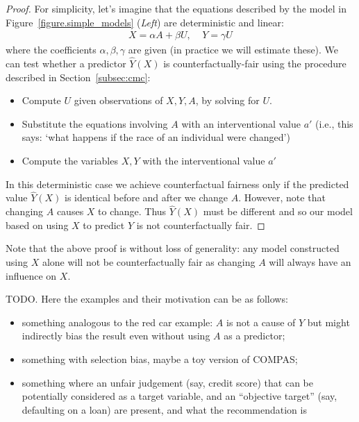 \begin{proof}
For simplicity, let's imagine that the equations described by the model in Figure~\ref{figure.simple_models} (\emph{Left}) are deterministic and linear:
\begin{align}
X = \alpha A + \beta U, \;\;\;\; Y = \gamma U \nonumber
\end{align}
where the coefficients $\alpha,\beta,\gamma$ are given (in practice we will estimate these). We can test whether a predictor $\hat{Y}(X)$ is counterfactually-fair using the procedure described in Section~\ref{subsec:cmc}:
\begin{itemize}
\item Compute $U$ given observations of $X,Y,A$, by solving for $U$.
\item Substitute the equations involving $A$ with an interventional value $a'$ (i.e., this says: `what happens if the race of an individual were changed')
\item Compute the variables $X,Y$ with the interventional value $a'$
\end{itemize}
In this deterministic case we achieve counterfactual fairness only if the predicted value $\hat{Y}(X)$ is identical before and after we change $A$. However, note that changing $A$ causes $X$ to change. Thus $\hat{Y}(X)$ must be different and so our model based on using $X$ to predict $Y$ is not counterfactually fair.
\end{proof}
Note that the above proof is without loss of generality: any model constructed using $X$ alone will not be counterfactually fair as changing $A$ will always have an influence on $X$.


TODO. Here the examples and their motivation can be as follows:

\begin{itemize}
\item something analogous to the red car example: $A$ is not a cause of
  $Y$ but might indirectly bias the result even without using $A$ as a predictor;
\item something with selection bias, maybe a toy version of COMPAS;
\item something where an unfair judgement (say, credit score) that can be potentially
  considered as a target variable, and an
  ``objective target'' (say, defaulting on a loan) are present, and
  what the recommendation is
\end{itemize}